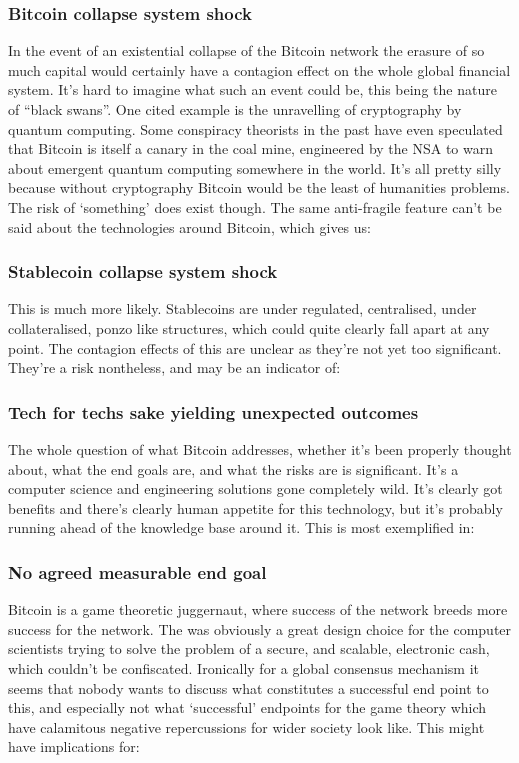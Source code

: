 \subsubsection{Bitcoin collapse system shock}
In the event of an existential collapse of the Bitcoin network the erasure of so much capital would certainly have a contagion effect on the whole global financial system. It's hard to imagine what such an event could be, this being the nature of ``black swans''. One cited example is the unravelling of cryptography by quantum computing. Some conspiracy theorists in the past have even speculated that Bitcoin is itself a canary in the coal mine, engineered by the NSA to warn about emergent quantum computing somewhere in the world. It's all pretty silly because without cryptography Bitcoin would be the least of humanities problems. The risk of `something' does exist though. The same anti-fragile feature can't be said about the technologies around Bitcoin, which gives us:
\subsubsection{Stablecoin collapse system shock}
This is much more likely. Stablecoins are under regulated, centralised, under collateralised, ponzo like structures, which could quite clearly fall apart at any point. The contagion effects of this are unclear as they're not yet too significant. They're a risk nontheless, and may be an indicator of:
\subsubsection{Tech for techs sake yielding unexpected outcomes}
The whole question of what Bitcoin addresses, whether it's been properly thought about, what the end goals are, and what the risks are is significant. It's a computer science and engineering solutions gone completely wild. It's clearly got benefits and there's clearly human appetite for this technology, but it's probably running ahead of the knowledge base around it. This is most exemplified in:
\subsubsection{No agreed measurable end goal}
 Bitcoin is a game theoretic juggernaut, where success of the network breeds more success for the network. The was obviously a great design choice for the computer scientists trying to solve the problem of a secure, and scalable, electronic cash, which couldn't be confiscated. Ironically for a global consensus mechanism it seems that nobody wants to discuss what constitutes a successful end point to this, and especially not what `successful' endpoints for the game theory which have calamitous negative repercussions for wider society look like.  This might have implications for:

